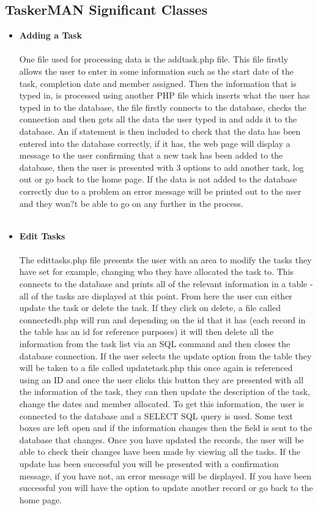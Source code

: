\documentclass{project}
\begin{document}
\subsection{TaskerMAN Significant Classes}
\begin{itemize}
\item \textbf{Adding a Task} \\~\\
One file used for processing data is the addtask.php file. This file firstly allows the user to enter in some information such as the start date of the task, completion date and member assigned. Then the information that is typed in, is processed using another PHP file which inserts what the user has typed in to the database, the file firstly connects to the database, checks the connection and then gets all the data the user typed in and adds it to the database. An if statement is then included to check that the data has been entered into the database correctly, if it has, the web page will display a message to the user confirming that a new task has been added to the database, then the user is presented with 3 options to add another task, log out or go back to the home page. If the data is not added to the database correctly due to a problem an error message will be printed out to the user and they won?t be able to go on any further in the process. \\~\\
\item \textbf{Edit Tasks} \\~\\
The edittasks.php file presents the user with an area to modify the tasks they have set for example, changing who they have allocated the task to. This connects to the database and prints all of the relevant information in a table - all of the tasks are displayed at this point. From here the user can either update the task or delete the task. If they click on delete, a file called connectedb.php will run and depending on the id that it has (each record in the table has an id for reference purposes) it will then delete all the information from the task list via an SQL command and then closes the database connection. If the user selects the update option from the table they will be taken to a file called updatetask.php this once again is referenced using an ID and once the user clicks this button they are presented with all the information of the task, they can then update the description of the task, change the dates and member allocated.  To get this information, the user is connected to the database and a SELECT SQL query is used. Some text boxes are left open and if the information changes then the field is sent to the database that changes. Once you have updated the records, the user will be able to check their changes have been made by viewing all the tasks. If the update has been successful you will be presented with a confirmation message, if you have not, an error message will be displayed. If you have been successful you will have the option to update another record or go back to the home page. \\~\\

\end{itemize}
\end{document}
